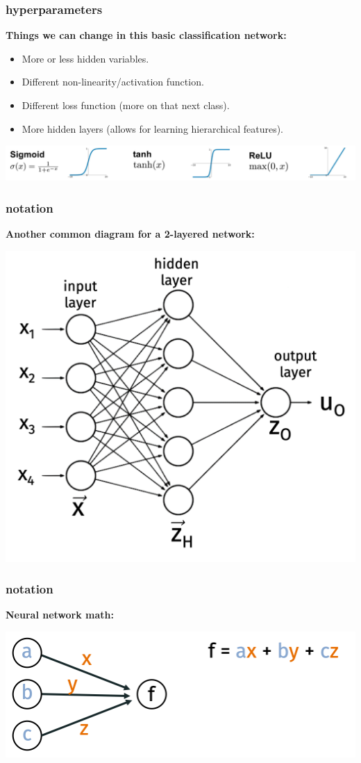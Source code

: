 \documentclass[handout,compress]{beamer}
\begin{document}
\begin{frame}
	\frametitle{hyperparameters}
	\textbf{Things we can change in this basic classification network:}
	\begin{itemize}
		\item More or less hidden variables.
		\item Different non-linearity/activation function.
		\item Different loss function (more on that next class). 
		\item More hidden layers (allows for learning hierarchical features).
	\end{itemize}
	\begin{center}
		\includegraphics[width=\textwidth]{activation_functions.png}
	\end{center}
\end{frame}


\begin{frame}
	\frametitle{notation}
	\textbf{Another common diagram for a 2-layered network:}
	\begin{center}
		\includegraphics[width=.6\textwidth]{noweights.png}
	\end{center}
\end{frame}

\begin{frame}
	\frametitle{notation}
	\textbf{Neural network math:}
	\begin{center}
		\includegraphics[width=.6\textwidth]{neural_math.png}
	\end{center}
\end{frame}
\end{document}

